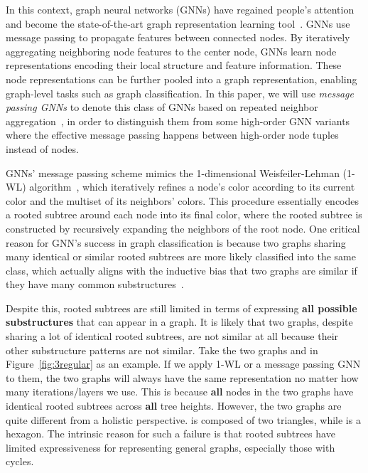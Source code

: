 \documentclass{article}
\begin{document}
In this context, graph neural networks (GNNs) have regained people's attention and become the state-of-the-art graph representation learning tool~\citep{scarselli2009graph,bruna2013spectral,duvenaud2015convolutional,li2015gated,kipf2016semi,defferrard2016convolutional,dai2016discriminative,velivckovic2017graph,zhang2018end,ying2018hierarchical}. GNNs use message passing to propagate features between connected nodes. By iteratively aggregating neighboring node features to the center node, GNNs learn node representations encoding their local structure and feature information. These node representations can be further pooled into a graph representation, enabling graph-level tasks such as graph classification. In this paper, we will use \textit{message passing GNNs} to denote this class of GNNs based on repeated neighbor aggregation~\citep{gilmer2017neural}, in order to distinguish them from some high-order GNN variants~\citep{morris2019weisfeiler,maron2019provably,chen2019equivalence} where the effective message passing happens between high-order node tuples instead of nodes.

GNNs' message passing scheme mimics the 1-dimensional Weisfeiler-Lehman (1-WL) algorithm~\citep{weisfeiler1968reduction}, which iteratively refines a node's color according to its current color and the multiset of its neighbors' colors. This procedure essentially encodes a rooted subtree around each node into its final color, where the rooted subtree is constructed by recursively expanding the neighbors of the root node. One critical reason for GNN's success in graph classification is because two graphs sharing many identical or similar rooted subtrees are more likely classified into the same class, which actually aligns with the inductive bias that two graphs are similar if they have many common substructures~\citep{vishwanathan2010graph}.

Despite this, rooted subtrees are still limited in terms of expressing \textbf{all possible substructures} that can appear in a graph. It is likely that two graphs, despite sharing a lot of identical rooted subtrees, are not similar at all because their other substructure patterns are not similar. Take the two graphs  and  in Figure~\ref{fig:3regular} as an example. If we apply 1-WL or a message passing GNN to them, the two graphs will always have the same representation no matter how many iterations/layers we use. This is because \textbf{all} nodes in the two graphs have identical rooted subtrees across \textbf{all} tree heights. However, the two graphs are quite different from a holistic perspective.  is composed of two triangles, while  is a hexagon. The intrinsic reason for such a failure is that rooted subtrees have limited expressiveness for representing general graphs, especially those with cycles.
\end{document}
